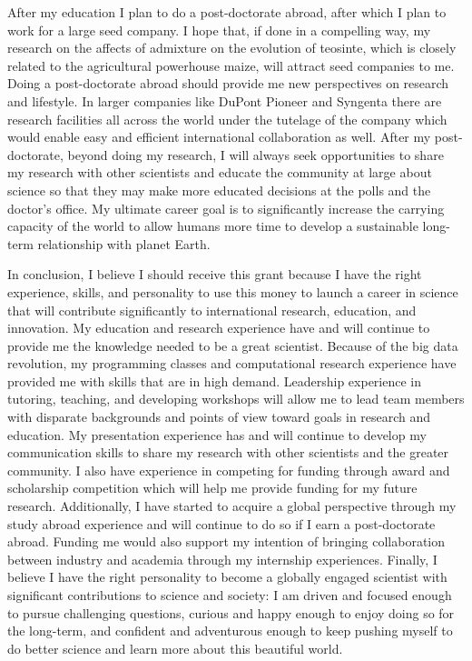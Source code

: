 \documentclass[12pt]{amsart}
\begin{document}
After my education I plan to do a post-doctorate abroad, after which I plan to work for a large seed company.
I hope that, if done in a compelling way, my research on the affects of admixture on the evolution of teosinte, which is closely related to the agricultural powerhouse maize, will attract seed companies to me.
Doing a post-doctorate abroad should provide me new perspectives on research and lifestyle.
In larger companies like DuPont Pioneer and Syngenta there are research facilities all across the world under the tutelage of the company which would enable easy and efficient international collaboration as well.
After my post-doctorate, beyond doing my research, I will always seek opportunities to share my research with other scientists and educate the community at large about science so that they may make more educated decisions at the polls and the doctor's office.
My ultimate career goal is to significantly increase the carrying capacity of the world to allow humans more time to develop a sustainable long-term relationship with planet Earth.

In conclusion, I believe I should receive this grant because I have the right experience, skills, and personality to use this money to launch a career in science that will contribute significantly to international research, education, and innovation.  
My education and research experience have and will continue to provide me the knowledge needed to be a great scientist.  
Because of the big data revolution, my programming classes and computational research experience have provided me with skills that are in high demand.
Leadership experience in tutoring, teaching, and developing workshops will allow me to lead team members with disparate backgrounds and points of view toward goals in research and education.
My presentation experience has and will continue to develop my communication skills to share my research with other scientists and the greater community.
I also have experience in competing for funding through award and scholarship competition which will help me provide funding for my future research.  
Additionally, I have started to acquire a global perspective through my study abroad experience and will continue to do so if I earn a post-doctorate abroad.  
Funding me would also support my intention of bringing collaboration between industry and academia through my internship experiences.
Finally, I believe I have the right personality to become a globally engaged scientist with significant contributions to science and society: I am driven and focused enough to pursue challenging questions, curious and happy enough to enjoy doing so for the long-term, and confident and adventurous enough to keep pushing myself to do better science and learn more about this beautiful world.
\end{document}
